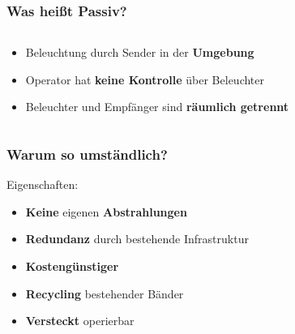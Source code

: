 \begin{frame}
    \frametitle{Was heißt Passiv?}

    \begin{columns}
        \begin{column}{0.6\textwidth}
            \begin{itemize}
                \item Beleuchtung durch Sender in der \textbf{Umgebung}
                \item Operator hat \textbf{keine Kontrolle} über Beleuchter
                \item Beleuchter und Empfänger sind \textbf{räumlich getrennt}
            \end{itemize}
        \end{column}
        \begin{column}{0.4\textwidth}
            \begin{figure}
                \centering
            \end{figure}
        \end{column}
    \end{columns}
\end{frame}

\begin{frame}
    \frametitle{Warum so umständlich?}

    Eigenschaften:
    \begin{itemize}
        \item \textbf{Keine} eigenen \textbf{Abstrahlungen} \faBroadcastTower{}
        \item \textbf{Redundanz} durch bestehende Infrastruktur \faCheckDouble{}
        \item \textbf{Kostengünstiger} \faMoneyBillWave{}
        \item \textbf{Recycling} bestehender Bänder \faRecycle{}
        \item \textbf{Versteckt} operierbar \faEyeSlash{}
    \end{itemize}
\end{frame}

